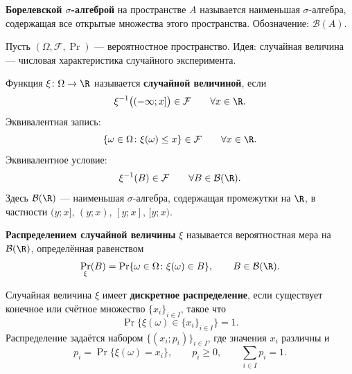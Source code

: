 
\begin{definition}
    \textbf{Борелевской $\sigma$-алгеброй} на пространстве $A$
    называется наименьшая $\sigma$-алгебра, содержащая все
    открытые множества этого пространства.
    Обозначение: $\mathcal{B}(A)$.
\end{definition}

Пусть $(\Omega,\mathcal{F},\Pr)$ --- вероятностное пространство.
Идея: случайная величина --- числовая характеристика
случайного эксперимента.

\begin{definition}
    Функция $\xi\colon\Omega\to\R$ называется
    \textbf{случайной величиной}, если
    \[
        \xi^{-1}\bigl((-\infty;x]\bigr)\in\mathcal{F}
        \qquad\forall x\in\R.
    \]
    Эквивалентная запись:
    \[
        \{\omega\in\Omega\colon\xi(\omega)\leq x\}
        \in\mathcal{F}
        \qquad\forall x\in\R.
    \]
    Эквивалентное условие:
    \[
        \xi^{-1}(B)\in\mathcal{F}
        \qquad\forall B\in\mathcal{B}(\R).
    \]
    Здесь $\mathcal{B}(\R)$ --- наименьшая $\sigma$-алгебра,
    содержащая промежутки на $\R$, в частности
    $(y;x]$, $(y;x)$, $[y;x]$, $[y;x)$.
\end{definition}

\begin{definition}
    \textbf{Распределением случайной величины} $\xi$ называется
    вероятностная мера на $\mathcal{B}(\R)$, определённая равенством
    \[
        \Pr_\xi(B)=\Pr\{\omega\in\Omega\colon\xi(\omega)\in B\},
        \qquad B\in\mathcal{B}(\R).
    \]
\end{definition}

\begin{definition}
    Случайная величина $\xi$ имеет \textbf{дискретное распределение},
    если существует конечное или счётное множество $\{x_i\}_{i\in I}$,
    такое что
    \[
        \Pr\{\xi(\omega)\in\{x_i\}_{i\in I}\}=1.
    \]
    Распределение задаётся набором $\{(x_i;p_i)\}_{i\in I}$,
    где значения $x_i$ различны и
    \[
        p_i=\Pr\{\xi(\omega)=x_i\},\qquad
        p_i\geq0,\qquad \sum_{i\in I}p_i=1.
    \]
\end{definition}

